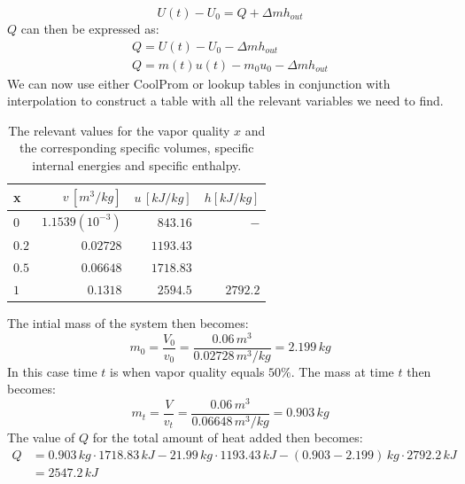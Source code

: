 \documentclass[11pt, a4paper]{article}
\begin{document}
\begin{equation*}
  U(t) - U_0 = Q + \Delta mh_{out}
\end{equation*}
$Q$ can then be expressed as:
\begin{gather*}
  Q = U(t) - U_0 - \Delta mh_{out}\\
  Q = m(t)u(t) - m_0u_0 - \Delta mh_{out}
\end{gather*}
We can now use either CoolProm or lookup tables in conjunction with interpolation to construct a table with all the relevant variables we need to find.
\begin{table}[h]
  \caption{The relevant values for the vapor quality $x$ and the corresponding specific volumes, specific internal energies and specific enthalpy.} %
  \centering %
  \begin{tabular}{l rrr} %
    \hline\hline %
    x & $v\,[m^3/kg]$ & $u\,[kJ/kg]$ & $h [kJ/kg]$\\ [0.5ex] %
    \hline \hline%
    $0$   & $1.1539(10^{-3})$ & $843.16 $ & $-$\\ 
    $0.2$ & $0.02728$       & $1193.43$ & \\
    $0.5$ & $0.06648$       & $1718.83$ & \\
    $1$   & $0.1318$        & $2594.5$  & $2792.2$\\
  \hline %
  \end{tabular}
\end{table}
The intial mass of the system then becomes:
\begin{equation*}
  m_0 = \frac{V_0}{v_0} = \frac{0.06\,m^3}{0.02728\,m^3/kg} = 2.199\,kg
\end{equation*}
In this case time $t$ is when vapor quality equals $50\%$. The mass at time $t$ then becomes:
\begin{equation*}
  m_t = \frac{V}{v_t} = \frac{0.06\,m^3}{0.06648\,m^3/kg}=0.903\,kg
\end{equation*}
The value of $Q$ for the total amount of heat added then becomes:
\begin{align*}
  Q &= 0.903\,kg\cdot 1718.83\,kJ - 21.99\,kg\cdot 1193.43\,kJ - (0.903 - 2.199)\,kg \cdot 2792.2\,kJ\\
    &= 2547.2\,kJ
\end{align*}
\end{document}
